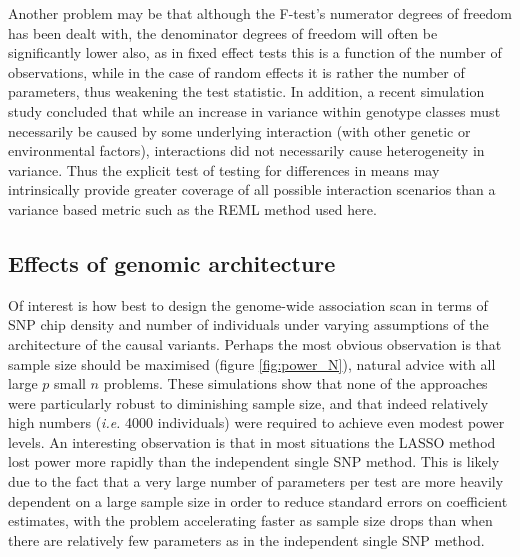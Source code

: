 Another problem may be that although the F-test's numerator degrees of freedom has been dealt with, the denominator degrees of freedom will often be significantly lower also, as in fixed effect tests this is a function of the number of observations, while in the case of random effects it is rather the number of parameters, thus weakening the test statistic. In addition, a recent simulation study \citep{Struchalin2010} concluded that while an increase in variance within genotype classes must necessarily be caused by some underlying interaction (with other genetic or environmental factors), interactions did not necessarily cause heterogeneity in variance. Thus the explicit test of testing for differences in means may intrinsically provide greater coverage of all possible interaction scenarios than a variance based metric such as the REML method used here.


\subsection{Effects of genomic architecture}

Of interest is how best to design the genome-wide association scan in terms of SNP chip density and number of individuals under varying assumptions of the architecture of the causal variants. Perhaps the most obvious observation is that sample size should be maximised (figure \ref{fig:power_N}), natural advice with all large $p$ small $n$ problems. These simulations show that none of the approaches were particularly robust to diminishing sample size, and that indeed relatively high numbers (\emph{i.e.} 4000 individuals) were required to achieve even modest power levels. An interesting observation is that in most situations the LASSO method lost power more rapidly than the independent single SNP method. This is likely due to the fact that a very large number of parameters per test are more heavily dependent on a large sample size in order to reduce standard errors on coefficient estimates, with the problem accelerating faster as sample size drops than when there are relatively few parameters as in the independent single SNP method.

